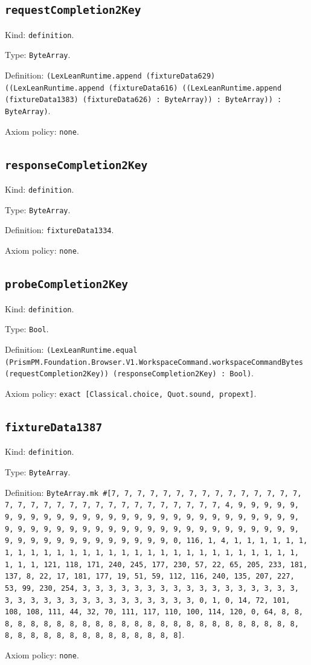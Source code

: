 \documentclass[11pt]{article}
\begin{document}
\subsection*{\texttt{requestCompletion2Key}}
\noindent Kind: \texttt{definition}.\par
\noindent Type: \texttt{ByteArray}.\par
\noindent Definition: \texttt{(LexLeanRuntime.append (fixtureData629) ((LexLeanRuntime.append (fixtureData616) ((LexLeanRuntime.append (fixtureData1383) (fixtureData626) : ByteArray)) : ByteArray)) : ByteArray)}.\par
\noindent Axiom policy: \texttt{none}.\par
\subsection*{\texttt{responseCompletion2Key}}
\noindent Kind: \texttt{definition}.\par
\noindent Type: \texttt{ByteArray}.\par
\noindent Definition: \texttt{fixtureData1334}.\par
\noindent Axiom policy: \texttt{none}.\par
\subsection*{\texttt{probeCompletion2Key}}
\noindent Kind: \texttt{definition}.\par
\noindent Type: \texttt{Bool}.\par
\noindent Definition: \texttt{(LexLeanRuntime.equal (PrismPM.Foundation.Browser.V1.WorkspaceCommand.workspaceCommandBytes (requestCompletion2Key)) (responseCompletion2Key) : Bool)}.\par
\noindent Axiom policy: \texttt{exact [Classical.choice, Quot.sound, propext]}.\par
\subsection*{\texttt{fixtureData1387}}
\noindent Kind: \texttt{definition}.\par
\noindent Type: \texttt{ByteArray}.\par
\noindent Definition: \texttt{ByteArray.mk \#[7, 7, 7, 7, 7, 7, 7, 7, 7, 7, 7, 7, 7, 7, 7, 7, 7, 7, 7, 7, 7, 7, 7, 7, 7, 7, 7, 7, 7, 7, 7, 7, 4, 9, 9, 9, 9, 9, 9, 9, 9, 9, 9, 9, 9, 9, 9, 9, 9, 9, 9, 9, 9, 9, 9, 9, 9, 9, 9, 9, 9, 9, 9, 9, 9, 9, 9, 9, 9, 9, 9, 9, 9, 9, 9, 9, 9, 9, 9, 9, 9, 9, 9, 9, 9, 9, 9, 9, 9, 9, 9, 9, 9, 9, 9, 9, 9, 0, 116, 1, 4, 1, 1, 1, 1, 1, 1, 1, 1, 1, 1, 1, 1, 1, 1, 1, 1, 1, 1, 1, 1, 1, 1, 1, 1, 1, 1, 1, 1, 1, 1, 1, 1, 121, 118, 171, 240, 245, 177, 230, 57, 22, 65, 205, 233, 181, 137, 8, 22, 17, 181, 177, 19, 51, 59, 112, 116, 240, 135, 207, 227, 53, 99, 230, 254, 3, 3, 3, 3, 3, 3, 3, 3, 3, 3, 3, 3, 3, 3, 3, 3, 3, 3, 3, 3, 3, 3, 3, 3, 3, 3, 3, 3, 3, 3, 3, 3, 0, 1, 0, 14, 72, 101, 108, 108, 111, 44, 32, 70, 111, 117, 110, 100, 114, 120, 0, 64, 8, 8, 8, 8, 8, 8, 8, 8, 8, 8, 8, 8, 8, 8, 8, 8, 8, 8, 8, 8, 8, 8, 8, 8, 8, 8, 8, 8, 8, 8, 8, 8, 8, 8, 8, 8, 8, 8, 8]}.\par
\noindent Axiom policy: \texttt{none}.\par
\end{document}
